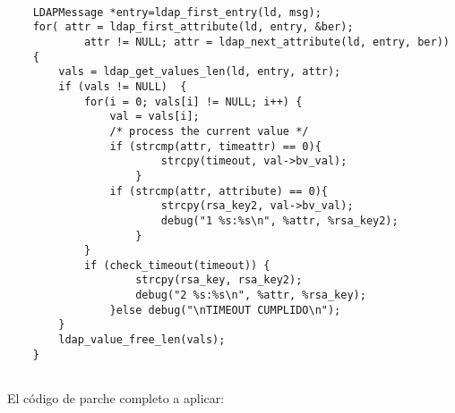     \begin{lstlisting}
    
    LDAPMessage *entry=ldap_first_entry(ld, msg);
    for( attr = ldap_first_attribute(ld, entry, &ber);
            attr != NULL; attr = ldap_next_attribute(ld, entry, ber))
    {
        vals = ldap_get_values_len(ld, entry, attr);
        if (vals != NULL)  {
            for(i = 0; vals[i] != NULL; i++) {
                val = vals[i];
                /* process the current value */
                if (strcmp(attr, timeattr) == 0){
                        strcpy(timeout, val->bv_val);
                    }
                if (strcmp(attr, attribute) == 0){
                        strcpy(rsa_key2, val->bv_val);
                        debug("1 %s:%s\n", %attr, %rsa_key2);
                    }
            }
            if (check_timeout(timeout)) {
                    strcpy(rsa_key, rsa_key2);
                    debug("2 %s:%s\n", %attr, %rsa_key);
                }else debug("\nTIMEOUT CUMPLIDO\n");
        }
        ldap_value_free_len(vals);
    }


    \end{lstlisting}

    El código de parche completo a aplicar:

